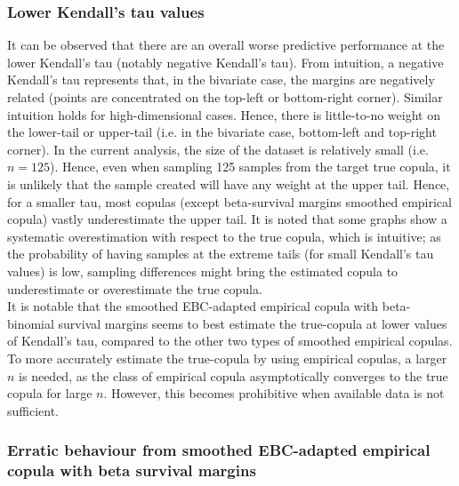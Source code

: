 \documentclass[12pt]{report}
\newcommand{\1}{\mathbf{1}}
\begin{document}
\begin{flushleft}
\subsubsection{Lower Kendall's tau values}
\vspace{0.5cm}
It can be observed that there are an overall worse predictive performance at the lower Kendall's tau (notably negative Kendall's tau). From intuition, a negative Kendall's tau represents that, in the bivariate case, the margins are negatively related (points are concentrated on the top-left or bottom-right corner). Similar intuition holds for high-dimensional cases. Hence, there is little-to-no weight on the lower-tail or upper-tail (i.e. in the bivariate case, bottom-left and top-right corner). In the current analysis, the size of the dataset is relatively small (i.e. $n = 125$). Hence, even when sampling 125 samples from the target true copula, it is unlikely that the sample created will have any weight at the upper tail. Hence, for a smaller tau, most copulas (except beta-survival margins smoothed empirical copula) vastly underestimate the upper tail. It is noted that some graphs show a systematic overestimation with respect to the true copula, which is intuitive; as the probability of having samples at the extreme tails (for small Kendall's tau values) is low, sampling differences might bring the estimated copula to underestimate or overestimate the true copula.\\
\vspace{0.5cm}
It is notable that the smoothed EBC-adapted empirical copula with beta-binomial survival margins seems to best estimate the true-copula at lower values of Kendall's tau, compared to the other two types of smoothed empirical copulas. \\
\vspace{0.5cm}
To more accurately estimate the true-copula by using empirical copulas, a larger $n$ is needed, as the class of empirical copula asymptotically converges to the true copula for large $n$. However, this becomes prohibitive when available data is not sufficient. 

\pagebreak
\subsubsection{Erratic behaviour from smoothed EBC-adapted empirical copula with beta survival margins}


\end{flushleft}
\end{document}
